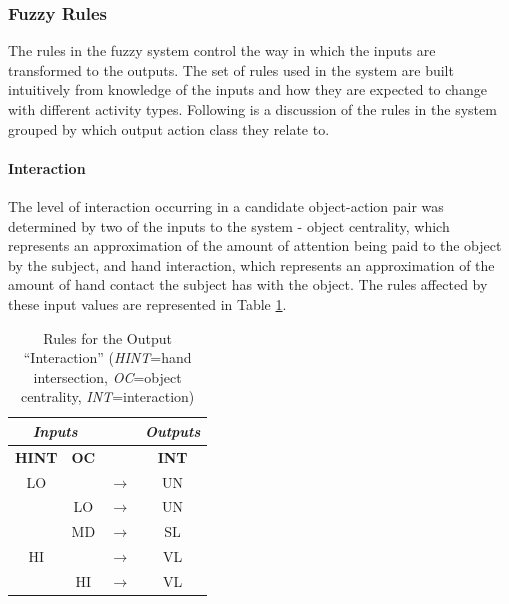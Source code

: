 \documentclass[12pt]{report}
\begin{document}
\subsubsection{Fuzzy Rules}
The rules in the fuzzy system control the way in which the inputs are transformed to the outputs. The set of rules used in the system are built intuitively from knowledge of the inputs and how they are expected to change with different activity types. Following is a discussion of the rules in the system grouped by which output action class they relate to.

\paragraph{Interaction}
The level of interaction occurring in a candidate object-action pair was determined by two of the inputs to the system - object centrality, which represents an approximation of the amount of attention being paid to the object by the subject, and hand interaction, which represents an approximation of the amount of hand contact the subject has with the object. The rules affected by these input values are represented in Table \ref{interactRules}.

\begin{table}
\caption{Rules for the Output ``Interaction'' (\textit{HINT}=hand intersection, \textit{OC}=object centrality, \textit{INT}=interaction)}
\begin{center}
\begin{tabular}{cccc}
\hline
\multicolumn{2}{c}{\textbf{\textit{Inputs}}}& &\textbf{\textit{Outputs}} \\
\hline
\hline
\textbf{HINT} & \textbf{OC} & & \textbf{INT}\\
\hline
 LO & & $\longrightarrow$ & UN \\
 & LO & $\longrightarrow$ & UN \\
 & MD & $\longrightarrow$ & SL \\
 HI & & $\longrightarrow$ & VL \\
  & HI & $\longrightarrow$ & VL \\
\hline
\end{tabular}
\label{interactRules}
\end{center}
\end{table}
\end{document}
